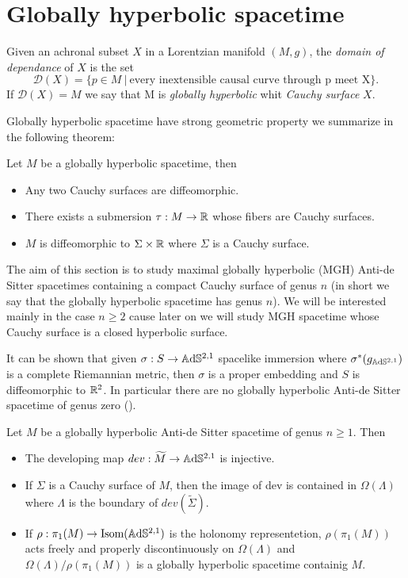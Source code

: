 \section{Globally hyperbolic spacetime}
\begin{definition}
    Given an achronal subset $X$ in a Lorentzian manifold $(M,g)$, the \textit{domain of dependance} of $X$ is the set
    \[
        \mathcal{D}(X)= \{ p \in M \ | \ \text{every inextensible causal curve through p meet X} \}.
    \]
    If $\mathcal{D}(X)=M$ we say that M is  \textit{globally hyperbolic} whit \textit{Cauchy surface} $X$.
\end{definition}
Globally hyperbolic spacetime have strong geometric property we summarize in the following theorem:
\begin{theorem}
    Let $M$ be a globally hyperbolic spacetime, then
    \begin{itemize}
        \item Any two Cauchy surfaces are diffeomorphic.
        \item There  exists a submersion $\tau : M \to \mathbb{R}$ whose fibers are Cauchy surfaces.
        \item $M$ is diffeomorphic to $\Sigma \times \mathbb{R}$ where $\Sigma$ is a Cauchy surface.
    \end{itemize}
\end{theorem}
The aim of this section is to study maximal globally hyperbolic (MGH) Anti-de Sitter spacetimes containing a compact Cauchy surface of genus $n$ (in short we say that the globally hyperbolic spacetime has genus $n$). We will be interested mainly in the case $n\geq 2$ cause later on we will study MGH spacetime whose Cauchy surface is a closed hyperbolic surface.\\ 
\begin{observation}
    It can be shown that given $\sigma :S \to\mathbb{A}\mathrm{d}\mathbb{S}^{2,1}$ spacelike immersion where $\sigma^*(g_{\mathbb{A}\mathrm{d}\mathbb{S}^{2,1}})$ is a complete Riemannian metric, then $\sigma$ is a proper embedding and $S$ is diffeomorphic to $\mathbb{R}^2$.
    In particular there are no globally hyperbolic Anti-de Sitter spacetime of genus zero (\cite{bonsanteseppi}).
\end{observation}
\begin{proposition}\label{prop:GH_geometry}
    Let $M$ be a globally hyperbolic Anti-de Sitter spacetime of genus $n\geq 1$. Then
    \begin{itemize}
        \item The developing map $dev: \widetilde{M} \to\mathbb{A}\mathrm{d}\mathbb{S}^{2,1}$ is injective.
        \item If $\Sigma$ is a Cauchy surface of $M$, then the image of dev is contained in $\Omega(\Lambda)$ where $\Lambda$ is the boundary of $dev(\widetilde{\Sigma})$.
        \item If $\rho : \pi_1(M) \to \text{Isom}(\mathbb{A}\mathrm{d}\mathbb{S}^{2,1})$ is the holonomy representetion, $\rho(\pi_1(M))$ acts freely and properly discontinuously on $\Omega(\Lambda)$ and $\Omega(\Lambda) / \rho(\pi_1(M))$ is a globally hyperbolic spacetime containig $M$.
    \end{itemize}
\end{proposition}
